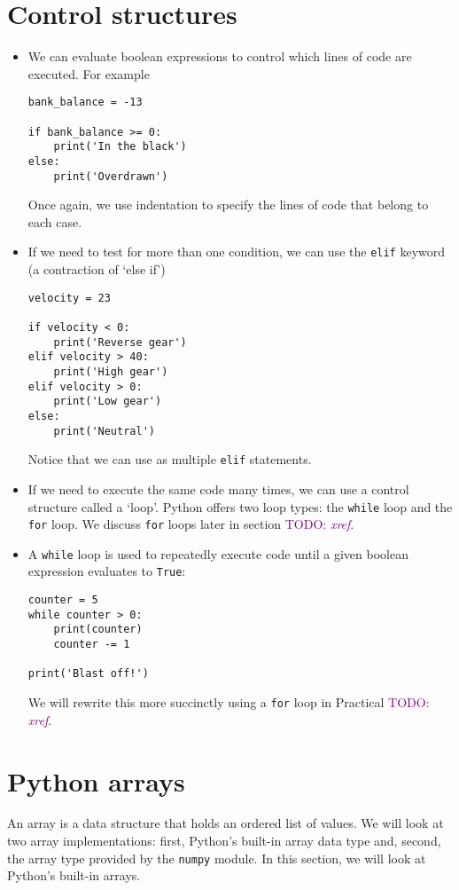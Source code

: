 \documentclass[a4paper,twoside]{memoir}
\newcommand{\shellcmd}{\texttt}
\newcommand{\TODO}[1]{\textcolor{purple}{TODO: \emph{#1}}}
\begin{document}
\section{Control structures}
\begin{itemize}
	\item We can evaluate boolean expressions to control which lines of code are executed.  For example
\begin{verbatim}
bank_balance = -13

if bank_balance >= 0:
	print('In the black')
else:
	print('Overdrawn')
\end{verbatim}
Once again, we use indentation to specify the lines of code that belong to each case.
	\item If we need to test for more than one condition, we can use the \shellcmd{elif} keyword (a contraction of `else if')
\begin{verbatim}
velocity = 23

if velocity < 0:
	print('Reverse gear')
elif velocity > 40:
	print('High gear')
elif velocity > 0:
	print('Low gear')
else:
	print('Neutral')
\end{verbatim}
Notice that we can use as multiple \shellcmd{elif} statements.
	\item If we need to execute the same code many times, we can use a control structure called a `loop'.  Python offers two loop types: the \shellcmd{while} loop and the \shellcmd{for} loop.  We discuss \shellcmd{for} loops later in section \TODO{xref}.
	\item A \shellcmd{while} loop is used to repeatedly execute code until a given boolean expression evaluates to \shellcmd{True}:
\begin{verbatim}
counter = 5
while counter > 0:
	print(counter)
	counter -= 1

print('Blast off!')
\end{verbatim}
We will rewrite this more succinctly using a \shellcmd{for} loop in Practical \TODO{xref}.
\end{itemize}

\section{Python arrays}
An array is a data structure that holds an ordered list of values.  We will look at two array implementations: first, Python's built-in array data type and, second, the array type provided by the \shellcmd{numpy} module.  In this section, we will look at Python's built-in arrays.
\end{document}
